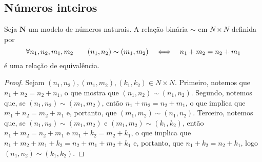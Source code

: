 \begin{comment}
6 & 6 & 10 & 16 & 20 & 26 & 30 & 36 & 40 & 46 & 50 & 56 & 60 \\

7 & 7 & 12 & 19 & 24 & 2\onze & 36 & 41 & 48 & 53 & 5\dez & 65 & 70 \\

8 & 8 & 14 & 20 & 28 & 34 & 40 & 48 & 54 & 60 & 68 & 74 & 80 \\

9 & 9 & 16 & 23 & 30 & 39 & 46 & 53 & 60 & 69 & 76 & 83 & 90 \\

\dez & \dez & 18 & 26 & 34 & 42 & 50 & 5\dez & 68 & 76 & 84 & 92 & \dez0 \\

\onze & \onze & 1\dez & 29 & 38 & 47 & 56 & 65 & 74 & 83 & 92 & \dez1 & \onze0 \\

10 & 10 & 20 & 30 & 40 & 50 & 60 & 70 & 80 & 90 & \dez0 & \onze0 & 100 \\
\hline
\end{tabular}
\caption{Tabela de multiplicação}
\label{tab:alg.tabela.multiplicacao}
\end{table}

\end{comment}



\subsection{Números inteiros}

\begin{proposition}
	Seja $\bm N$ um modelo de números naturais. A relação binária $\sim$ em $N \times N$ definida por
	\begin{equation*}
	\forall n_1,n_2,m_1,m_2 \qquad (n_1,n_2) \sim (m_1,m_2) \quad \Longleftrightarrow \quad n_1+m_2=n_2+m_1
	\end{equation*}
é uma relação de equivalência.
\end{proposition}
\begin{proof}
	Sejam $(n_1,n_2), (m_1,m_2),(k_1,k_2) \in N \times N$. Primeiro, notemos que $n_1+n_2=n_2+n_1$, o que mostra que $(n_1,n_2) \sim (n_1,n_2)$. Segundo, notemos que, se $(n_1,n_2) \sim (m_1,m_2)$, então $n_1+m_2=n_2+m_1$, o que implica que $m_1+n_2=m_2+n_1$ e, portanto, que $(m_1,m_2) \sim (n_1,n_2)$. Terceiro, notemos que, se $(n_1,n_2) \sim (m_1,m_2)$ e $(m_1,m_2) \sim (k_1,k_2)$, então $n_1+m_2=n_2+m_1$ e $m_1+k_2=m_2+k_1$, o que implica que $n_1+m_2+m_1+k_2=n_2+m_1+m_2+k_1$ e, portanto, que $n_1+k_2=n_2+k_1$, logo $(n_1,n_2) \sim (k_1,k_2)$.
\end{proof}

